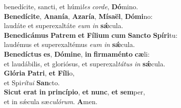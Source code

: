\oddverse benedícite, sancti, et húmi\textit{les} \textit{cor}\textit{de}, \textbf{Dó}mino.\\
\evenverse \textbf{Be}\textbf{ne}\textbf{dí}\textbf{ci}\textbf{te}, \textbf{A}\textbf{na}\textbf{ní}\textbf{a}, \textbf{A}\textbf{za}\textbf{rí}\textbf{a}, \textbf{Mí}\textbf{sa}\textbf{ël}, \textbf{Dó}\textbf{mi}no:~\*\\
\evenverse laudáte et superexaltáte \textit{e}\textit{um} \textit{in} \textbf{sǽ}cula.\\
\oddverse \textbf{Be}\textbf{ne}\textbf{di}\textbf{cá}\textbf{mus} \textbf{Pa}\textbf{trem} \textbf{et} \textbf{Fí}\textbf{li}\textbf{um} \textbf{cum} \textbf{San}\textbf{cto} \textbf{Spí}\textbf{ri}tu:~\*\\
\oddverse laudémus et superexaltémus \textit{e}\textit{um} \textit{in} \textbf{sǽ}cula.\\
\evenverse \textbf{Be}\textbf{ne}\textbf{dí}\textbf{ctus} \textbf{es}, \textbf{Dó}\textbf{mi}\textbf{ne}, \textbf{in} \textbf{fir}\textbf{ma}\textbf{mén}\textbf{to} \textbf{cæ}li:~\*\\
\evenverse et laudábilis, et gloriósus, et superexal\textit{tá}\textit{tus} \textit{in} \textbf{sǽ}cula.\\
\oddverse \textbf{Gló}\textbf{ri}\textbf{a} \textbf{Pa}\textbf{tri}, \textbf{et} \textbf{Fí}\textbf{li}o,~\*\\
\oddverse et Spi\textit{rí}\textit{tu}\textit{i} \textbf{San}cto.\\
\evenverse \textbf{Si}\textbf{cut} \textbf{e}\textbf{rat} \textbf{in} \textbf{prin}\textbf{cí}\textbf{pi}\textbf{o}, \textbf{et} \textbf{nunc}, \textbf{et} \textbf{sem}per,~\*\\
\evenverse et in sǽcula sæ\textit{cu}\textit{ló}\textit{rum}. \textbf{A}men.\\
